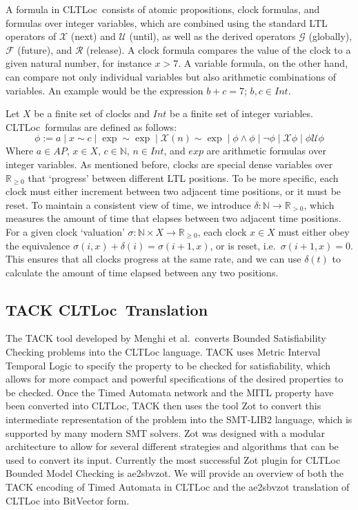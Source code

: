 \documentclass[a4paper,12pt]{article}
\newcommand*\BitOr{\mathbin{|}}
\newcommand{\cltloc}{CLTLoc}
\newcommand{\aez}{ae2sbvzot}
\begin{document}
A formula in \cltloc\ consists of atomic propositions, clock formulas, and
formulas over integer variables, which are combined using the standard LTL
operators of \(\mathcal{X}\) (next) and \(\mathcal{U}\) (until), as well as the
derived operators \(\mathcal{G}\) (globally), \(\mathcal{F}\) (future), and
\(\mathcal{R}\) (release). A clock formula compares the value of the clock to a
given natural number, for instance \(x > 7\). A variable formula, on the other
hand, can compare not only individual variables but also arithmetic combinations
of variables. An example would be the expression \(b + c = 7\); \(b,c \in Int\).

Let \(X\) be a finite set of clocks and \(Int\) be a finite set of integer
variables. \cltloc\ formulas are defined as follows:
\[\phi := a \BitOr x \sim c \BitOr \exp \sim \exp \BitOr \mathcal{X}(n) \sim \exp \BitOr \phi \land \phi \BitOr \neg \phi \BitOr \mathcal{X}\phi \BitOr \phi \mathcal{U} \phi \]
Where \(a \in AP\), \(x \in X\), \(c \in \mathbb{N}\), \(n \in Int\), and
\(exp\) are arithmetic formulas over integer variables. As mentioned before,
clocks are special dense variables over \(\mathbb{R}_{\geq 0}\) that `progress'
between different LTL positions. To be more specific, each clock must either
increment between two adjacent time positions, or it must be reset. To maintain
a consistent view of time, we introduce
\(\delta: \mathbb{N} \rightarrow \mathbb{R}_{>0}\), which measures the amount of
time that elapses between two adjacent time positions. For a given clock
`valuation' \(\sigma: \mathbb{N} \times X \rightarrow \mathbb{R}_{\geq 0}\),
each clock \(x \in X\) must either obey the equivalence
\(\sigma(i,x) + \delta(i) = \sigma(i+1,x)\), or is reset, i.e.\
\(\sigma(i+1,x) = 0\). This ensures that all clocks progress at the same rate,
and we can use \(\delta(t)\) to calculate the amount of time elapsed between any
two positions.

\subsection{TACK \cltloc\ Translation}\label{prelim-tack}

The TACK\cite{tack20} tool developed by Menghi et al.\ converts Bounded
Satisfiability Checking problems into the CLTLoc language. TACK uses Metric
Interval Temporal Logic to specify the property to be checked for satisfiability,
which allows for more compact and powerful specifications of the desired
properties to be checked. Once the Timed Automata network and the MITL property
have been converted into CLTLoc, TACK then uses the tool Zot to convert this
intermediate representation of the problem into the SMT-LIB2 language, which is
supported by many modern SMT solvers. Zot was designed with a modular
architecture to allow for several different strategies and algorithms that can
be used to convert its input. Currently the most successful Zot plugin for
CLTLoc Bounded Model Checking is \aez. We will provide an overview of both
the TACK encoding of Timed Automata in CLTLoc and the ae2sbvzot translation of
CLTLoc into BitVector form.
\end{document}

